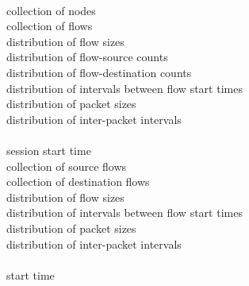 \textbf{}\\
\hspace*{1ex}\raisebox{1.5pt}{$\centerdot$}~collection of nodes\\
\hspace*{1ex}\raisebox{1.5pt}{$\centerdot$}~collection of flows\\
\hspace*{1ex}\raisebox{1.5pt}{$\centerdot$}~distribution of flow sizes\\
\hspace*{1ex}\raisebox{1.5pt}{$\centerdot$}~distribution of flow-source counts\\
\hspace*{1ex}\raisebox{1.5pt}{$\centerdot$}~distribution of flow-destination counts\\
\hspace*{1ex}\raisebox{1.5pt}{$\centerdot$}~distribution of intervals between flow start times\\
\hspace*{1ex}\raisebox{1.5pt}{$\centerdot$}~distribution of packet sizes\\
\hspace*{1ex}\raisebox{1.5pt}{$\centerdot$}~distribution of inter-packet intervals\\
[3pt]
\textbf{}\\
\hspace*{1ex}\raisebox{1.5pt}{$\centerdot$}~session start time\\
\hspace*{1ex}\raisebox{1.5pt}{$\centerdot$}~collection of source flows\\
\hspace*{1ex}\raisebox{1.5pt}{$\centerdot$}~collection of destination flows\\
\hspace*{1ex}\raisebox{1.5pt}{$\centerdot$}~distribution of flow sizes\\
\hspace*{1ex}\raisebox{1.5pt}{$\centerdot$}~distribution of intervals between flow start times\\
\hspace*{1ex}\raisebox{1.5pt}{$\centerdot$}~distribution of packet sizes\\
\hspace*{1ex}\raisebox{1.5pt}{$\centerdot$}~distribution of inter-packet intervals\\
[3pt]
\textbf{}\\
\hspace*{1ex}\raisebox{1.5pt}{$\centerdot$}~start time\\
